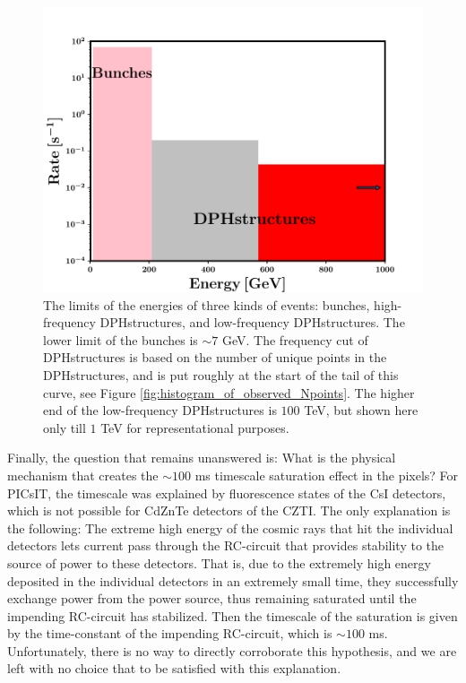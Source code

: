 \begin{figure}
\begin{center}
\includegraphics[scale=0.5]{Energy_limits}
\caption[Energy limits of bunches and DPHstructures]{The limits of the energies of three kinds of events: bunches, high-frequency DPHstructures, and low-frequency DPHstructures. The lower limit of the bunches is $ \sim 7 $ GeV. The frequency cut of DPHstructures is based on the number of unique points in the DPHstructures, and is put roughly at the start of the tail of this curve, see Figure \ref{fig:histogram_of_observed_Npoints}. The higher end of the low-frequency DPHstructures is $100$ TeV, but shown here only till $1$ TeV for representational purposes.}
\label{fig:Energy_limits}
\end{center}
\end{figure}


Finally, the question that remains unanswered is: What is the physical mechanism that creates the $\sim 100$ ms timescale saturation effect in the pixels? For PICsIT, the timescale was explained by fluorescence states of the CsI detectors, which is not possible for CdZnTe detectors of the CZTI. The only explanation is the following: The extreme high energy of the cosmic rays that hit the individual detectors lets current pass through the RC-circuit that provides stability to the source of power to these detectors. That is, due to the extremely high energy deposited in the individual detectors in an extremely small time, they successfully exchange power from the power source, thus remaining saturated until the impending RC-circuit has stabilized. Then the timescale of the saturation is given by the time-constant of the impending RC-circuit, which is $\sim 100$ ms. Unfortunately, there is no way to directly corroborate this hypothesis, and we are left with no choice that to be satisfied with this explanation.


